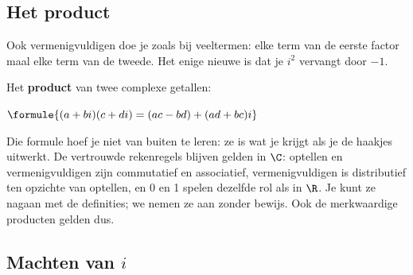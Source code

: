 \subsection{Het product}

Ook vermenigvuldigen doe je zoals bij veeltermen: elke term van de eerste factor maal elke term van de tweede. Het enige nieuwe is dat je $i^2$ vervangt door $-1$.

\begin{theorie}
Het \textbf{\textcolor{accent}{product}} van twee complexe getallen:

\vspace{1mm}
\qquad $\formule{(a + bi)(c + di) = (ac - bd) + (ad + bc)i}$
\end{theorie}

Die formule hoef je niet van buiten te leren: ze is wat je krijgt als je de haakjes uitwerkt. De vertrouwde rekenregels blijven gelden in $\C$: optellen en vermenigvuldigen zijn commutatief en associatief, vermenigvuldigen is distributief ten opzichte van optellen, en 0 en 1 spelen dezelfde rol als in $\R$. Je kunt ze nagaan met de definities; we nemen ze aan zonder bewijs. Ook de merkwaardige producten gelden dus.



\subsection{Machten van \texorpdfstring{$i$}{i}}

